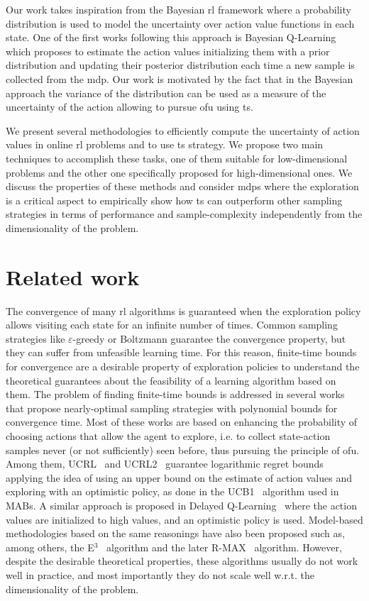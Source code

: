 Our work takes inspiration from the Bayesian \gls{rl} framework where a probability distribution is used to model the uncertainty over action value functions in each state. One of the first works following this approach is Bayesian Q-Learning~\cite{dearden1998bayesian} which proposes to estimate the action values initializing them with a prior distribution and updating their posterior distribution each time a new sample is collected from the \gls{mdp}. Our work is motivated by the fact that in the Bayesian approach the variance of the distribution can be used as a measure of the uncertainty of the action allowing to pursue \gls{ofu} using \gls{ts}.

We present several methodologies to efficiently compute the uncertainty of action values in online \gls{rl} problems and to use \gls{ts} strategy. We propose two main techniques to accomplish these tasks, one of them suitable for low-dimensional problems and the other one specifically proposed for high-dimensional ones. We discuss the properties of these methods and consider \glspl{mdp} where the exploration is a critical aspect to empirically show how \gls{ts} can outperform other sampling strategies in terms of performance and sample-complexity independently from the dimensionality of the problem. 

\section{Related work}
The convergence of many \gls{rl} algorithms is guaranteed when the exploration policy allows visiting each state for an infinite number of times. Common sampling strategies like $\varepsilon$-greedy or Boltzmann guarantee the convergence property, but they can suffer from unfeasible learning time. For this reason, finite-time bounds for convergence are a desirable property of exploration policies to understand the theoretical guarantees about the feasibility of a learning algorithm based on them. The problem of finding finite-time bounds is addressed in several works that propose nearly-optimal sampling strategies with polynomial bounds for convergence time. Most of these works are based on enhancing the probability of choosing actions that allow the agent to explore, i.e. to collect state-action samples never (or not sufficiently) seen before, thus pursuing the principle of \gls{ofu}. Among them, UCRL~\cite{auer2007logarithmic} and UCRL2~\cite{jaksch2010near} guarantee logarithmic regret bounds applying the idea of using an upper bound on the estimate of action values and exploring with an optimistic policy, as done in the UCB1~\cite{auer2002finite} algorithm used in MABs. A similar approach is proposed in Delayed Q-Learning~\cite{strehl2006pac} where the action values are initialized to high values, and an optimistic policy is used. Model-based methodologies based on the same reasonings have also been proposed such as, among others, the E$^3$~\cite{kearns2002near} algorithm and the later R-MAX~\cite{brafman2002r} algorithm. However, despite the desirable theoretical properties, these algorithms usually do not work well in practice, and most importantly they do not scale well w.r.t. the dimensionality of the problem.

